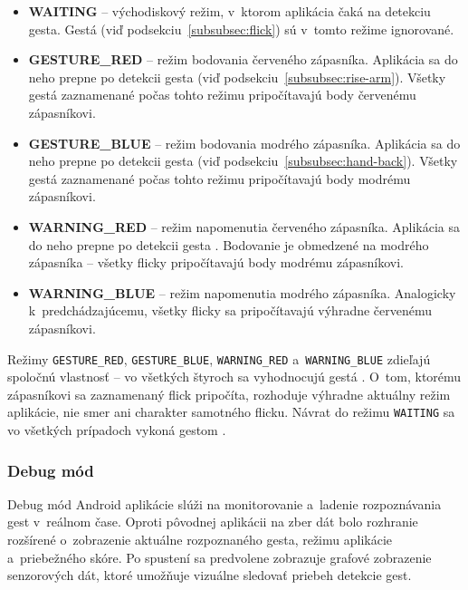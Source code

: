 \begin{itemize}
  \item \textbf{WAITING} -- východiskový režim,
        v~ktorom aplikácia čaká na detekciu gesta.
        Gestá  (viď podsekciu~\ref{subsubsec:flick})
        sú v~tomto režime ignorované.
  \item \textbf{GESTURE\_RED} -- režim bodovania
        červeného zápasníka. Aplikácia sa do neho
        prepne po detekcii gesta 
        (viď podsekciu~\ref{subsubsec:rise-arm}).
        Všetky gestá  zaznamenané počas
        tohto režimu pripočítavajú body červenému
        zápasníkovi.
  \item \textbf{GESTURE\_BLUE} -- režim bodovania
        modrého zápasníka. Aplikácia sa do neho
        prepne po detekcii gesta 
        (viď podsekciu~\ref{subsubsec:hand-back}).
        Všetky gestá  zaznamenané počas
        tohto režimu pripočítavajú body modrému
        zápasníkovi.
  \item \textbf{WARNING\_RED} -- režim napomenutia
        červeného zápasníka. Aplikácia sa do neho prepne
        po detekcii gesta .
        Bodovanie je obmedzené na modrého zápasníka --
        všetky flicky pripočítavajú body modrému zápasníkovi.
  \item \textbf{WARNING\_BLUE} -- režim napomenutia
        modrého zápasníka. Analogicky k~predchádzajúcemu,
        všetky flicky sa pripočítavajú výhradne červenému
        zápasníkovi.
\end{itemize}

Režimy \texttt{GESTURE\_RED}, \texttt{GESTURE\_BLUE},
\texttt{WARNING\_RED} a~\texttt{WARNING\_BLUE} zdieľajú
spoločnú vlastnosť -- vo všetkých štyroch sa vyhodnocujú
gestá . O~tom, ktorému zápasníkovi sa
zaznamenaný flick pripočíta, rozhoduje výhradne aktuálny
režim aplikácie, nie smer ani charakter samotného flicku.
Návrat do režimu \texttt{WAITING} sa vo všetkých
prípadoch vykoná gestom .

\subsubsection{Debug mód}
\label{app:debug-final}
Debug mód Android aplikácie slúži na monitorovanie
a~ladenie rozpoznávania gest v~reálnom čase. Oproti
pôvodnej aplikácii na zber dát bolo rozhranie
rozšírené o~zobrazenie aktuálne rozpoznaného gesta,
režimu aplikácie a~priebežného skóre. Po spustení sa
predvolene zobrazuje grafové zobrazenie senzorových
dát, ktoré umožňuje vizuálne sledovať priebeh
detekcie gest.

